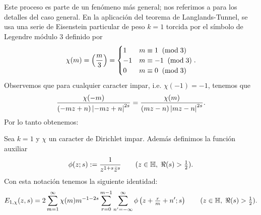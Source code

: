 \documentclass[../../tesis_maestria]{subfiles}
\begin{document}
Este proceso es parte de un fen\'omeno m\'as general; nos referimos a \cite[\S7.2]{MiyakeMF} para
los detalles del caso general. En la aplicaci\'on del teorema de Langlands-Tunnel, se usa una serie
de Eisenstein particular de peso $k=1$ torcida por el s\'imbolo de Legendre m\'odulo 3 definido
por
\[
  \chi(m)=\left(\frac{m}{3}\right)=
  \begin{cases}
    1 & m\equiv 1 \;\;(\mathrm{mod}\; 3)\\
    -1 & m\equiv -1 \;\;(\mathrm{mod}\; 3)\\
    0 & m\equiv 0 \;\;(\mathrm{mod}\; 3)
  \end{cases}.
\]
Observemos que para cualquier caracter impar, i.e. $\chi(-1)=-1$, tenemos que
\begin{equation}\label{eq:chiimpar}
  \frac{\chi(-m)}{(-mz+n)\left| -mz+n \right|^{2s}}=\frac{\chi(m)}{(mz-n)\left| mz-n \right|^{2s}}.
\end{equation}
Por lo tanto obtenemos:

\begin{prop}
  Sea $k=1$ y $\chi$ un caracter de Dirichlet impar. Adem\'as definimos la funci\'on auxiliar
  \[
    \phi(z;s):=\frac{1}{z^{1+s}\bar{z}^s}\qquad(z\in\mathbb{H},\;\Re(s)>\tfrac{1}{2}).
  \]
  Con esta notaci\'on tenemos la siguiente identidad:
\begin{equation}\label{eq:E1chi}
  E_{1,\chi}(z,s)=
  2\sum_{m=1}^{\infty}\chi(m)m^{-1-2s}\sum_{r=0}^{m-1}
  \sum_{n'=-\infty}^{\infty}\phi\left( z+\tfrac{r}{m}+n';s \right)\qquad(z\in\mathbb{H},\;\Re(s)>\tfrac{1}{2}).
\end{equation}
\end{prop}
\end{document}
